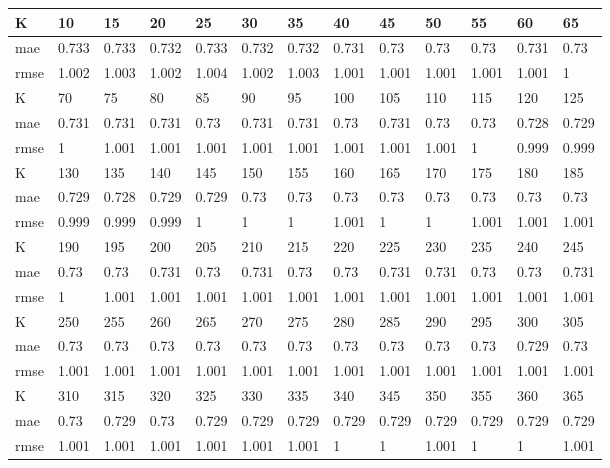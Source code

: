 \begin{appendices}
\begin{center} \label{tab19}
	\begin{tabularx}{\textwidth}{|l|X|X|X|X|X|X|X|X|X|X|X|X|} 
		\hline 
		K & 10 & 15 & 20 & 25 & 30 & 35 & 40 & 45 & 50 & 55 & 60 & 65 \\ \hline 
		mae & 0.733 & 0.733 & 0.732 & 0.733 & 0.732 & 0.732 & 0.731 & 0.73 & 0.73 & 0.73 & 0.731 & 0.73 \\ \hline 
		rmse & 1.002 & 1.003 & 1.002 & 1.004 & 1.002 & 1.003 & 1.001 & 1.001 & 1.001 & 1.001 & 1.001 & 1 \\ \hline 
		\hline 
		K & 70 & 75 & 80 & 85 & 90 & 95 & 100 & 105 & 110 & 115 & 120 & 125 \\ \hline 
		mae & 0.731 & 0.731 & 0.731 & 0.73 & 0.731 & 0.731 & 0.73 & 0.731 & 0.73 & 0.73 & 0.728 & 0.729 \\ \hline 
		rmse & 1 & 1.001 & 1.001 & 1.001 & 1.001 & 1.001 & 1.001 & 1.001 & 1.001 & 1 & 0.999 & 0.999 \\ \hline 
		\hline 
		K & 130 & 135 & 140 & 145 & 150 & 155 & 160 & 165 & 170 & 175 & 180 & 185 \\ \hline 
		mae & 0.729 & 0.728 & 0.729 & 0.729 & 0.73 & 0.73 & 0.73 & 0.73 & 0.73 & 0.73 & 0.73 & 0.73 \\ \hline 
		rmse & 0.999 & 0.999 & 0.999 & 1 & 1 & 1 & 1.001 & 1 & 1 & 1.001 & 1.001 & 1.001 \\ \hline 
		\hline 
		K & 190 & 195 & 200 & 205 & 210 & 215 & 220 & 225 & 230 & 235 & 240 & 245 \\ \hline 
		mae & 0.73 & 0.73 & 0.731 & 0.73 & 0.731 & 0.73 & 0.73 & 0.731 & 0.731 & 0.73 & 0.73 & 0.731 \\ \hline 
		rmse & 1 & 1.001 & 1.001 & 1.001 & 1.001 & 1.001 & 1.001 & 1.001 & 1.001 & 1.001 & 1.001 & 1.001 \\ \hline 
		\hline 
		K & 250 & 255 & 260 & 265 & 270 & 275 & 280 & 285 & 290 & 295 & 300 & 305 \\ \hline 
		mae & 0.73 & 0.73 & 0.73 & 0.73 & 0.73 & 0.73 & 0.73 & 0.73 & 0.73 & 0.73 & 0.729 & 0.73 \\ \hline 
		rmse & 1.001 & 1.001 & 1.001 & 1.001 & 1.001 & 1.001 & 1.001 & 1.001 & 1.001 & 1.001 & 1.001 & 1.001 \\ \hline 
		\hline 
		K & 310 & 315 & 320 & 325 & 330 & 335 & 340 & 345 & 350 & 355 & 360 & 365 \\ \hline 
		mae & 0.73 & 0.729 & 0.73 & 0.729 & 0.729 & 0.729 & 0.729 & 0.729 & 0.729 & 0.729 & 0.729 & 0.729 \\ \hline 
		rmse & 1.001 & 1.001 & 1.001 & 1.001 & 1.001 & 1.001 & 1 & 1 & 1.001 & 1 & 1 & 1.001 \\ \hline 

\end{tabularx}
\end{center}
\end{appendices}
